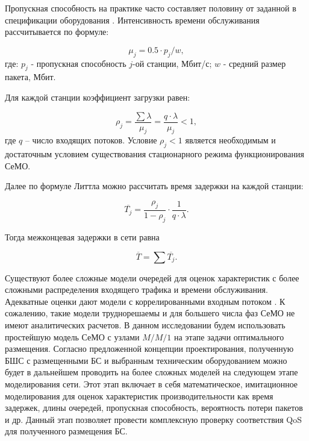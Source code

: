Пропускная способность на практике часто составляет половину от заданной в спецификации оборудования \cite{Proletarsky, Vladimirov2019}. Интенсивность времени обслуживания рассчитывается по формуле: 

\begin{displaymath}
    \mu_j = 0.5 \cdot p_j / w,
\end{displaymath}
где: $p_j$ - пропускная способность $j$-ой станции, Мбит/с; $w$ - средний размер пакета, Мбит.

Для каждой станции коэффициент загрузки равен:


\begin{displaymath}
\rho_j= \frac{\sum{\lambda}}{\mu_j} = \frac{q \cdot \lambda}{\mu_j} <1,
\end{displaymath}
где $q$ -- число входящих потоков. Условие $\rho_j<1$ является необходимым и достаточным условием существования стационарного режима функционирования СеМО.

Далее по формуле Литтла \cite{Little1961} можно рассчитать время задержки на каждой станции:

\begin{displaymath}
    \overline{T_j} = \frac{\rho_j}{1 - \rho_j} \cdot \frac{1}{q \cdot \lambda}.
\end{displaymath}

Тогда межконцевая задержки в сети равна

\begin{equation}
    \label{eq:end_to_end_delay}
    \overline{T}= \sum{\overline{T_j}}.
\end{equation}


Существуют более сложные модели очередей для оценок характеристик с более сложными распределения входящего трафика и времени обслуживания. Адекватные оценки дают модели с коррелированными входным потоком \cite{Vishnevsky2016_Methods_of_performance, Larionov2019}. К сожалению, такие модели труднорешаемы и для большего числа фаз СеМО не имеют аналитических расчетов. В данном исследовании будем использовать простейшую модель СеМО с узлами $M/M/1$ на этапе задачи оптимального размещения. Согласно предложенной концепции проектирования, полученную БШС с размещенными БС и выбранным техническим оборудованием можно будет в дальнейшем проводить на более сложных моделей на следующем этапе моделирования сети. Этот этап включает в себя математическое, имитационное моделирования для оценок характеристик производительности как время задержек, длины очередей, пропускная способность, вероятность потери пакетов и др. Данный этап позволяет провести комплексную проверку соответствия QoS для полученного размещения БС.

